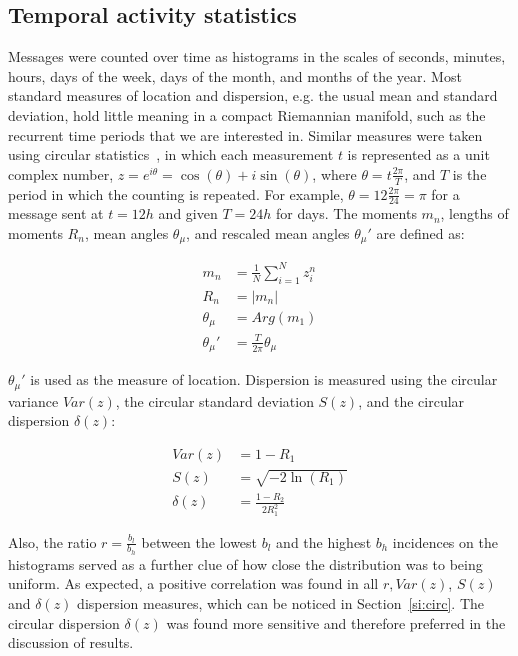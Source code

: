 \subsection{Temporal activity statistics}\label{sec:mtime}
Messages were counted over time as histograms in the scales of seconds,
minutes, hours, days of the week, days of the month, and months of the year.
Most standard measures of location and dispersion, e.g. the usual mean and
standard deviation, hold little meaning in a compact Riemannian manifold,
such as the recurrent time periods that we are interested in.
Similar measures were taken using circular statistics~\cite{directionalStats},
in which each measurement $t$ is represented as a unit complex number,
$z=e^{i\theta}=\cos(\theta)+i\sin(\theta)$, where $\theta=t\frac{2\pi}{T}$,
and $T$ is the period in which the counting is repeated.
For example, $\theta=12\frac{2\pi}{24}=\pi$ for a message sent at $t=12h$ and given $T=24h$ for days.
The moments $m_n$, lengths of moments $R_n$, mean angles $\theta_\mu$, and rescaled mean angles $\theta_\mu'$ are defined as:

\begin{align}\label{eq:cmom}
m_n&=\frac{1}{N}\sum_{i=1}^N z_i^n \nonumber\\
R_n&=|m_n|\\
\theta_\mu&=Arg(m_1) \nonumber \\
\theta_\mu'&=\frac{T}{2\pi} \theta_\mu \nonumber
\end{align}

$\theta_\mu'$ is used as the measure of location.
Dispersion is measured using the circular variance $Var(z)$,
the circular standard deviation $S(z)$, and the circular dispersion $\delta(z)$:

\begin{align}\label{eq:cmd}
Var(z)&=1 - R_1 \nonumber\\
S(z)&= \sqrt{-2\ln(R_1)}\\
\delta(z)&=\frac{1-R_2}{2 R_1^2} \nonumber
\end{align}

\noindent
Also, the ratio $r=\frac{b_l}{b_h}$ between the lowest $b_l$ and the highest $b_h$ incidences on the histograms 
served as a further clue of how close the distribution was to being uniform. As expected, a positive correlation was found in all $r, Var(z)$, $S(z)$ and $\delta(z)$ dispersion measures,
which can be noticed in Section~\ref*{si:circ}.
The circular dispersion $\delta(z)$ was found more sensitive and therefore preferred in the discussion of results.


